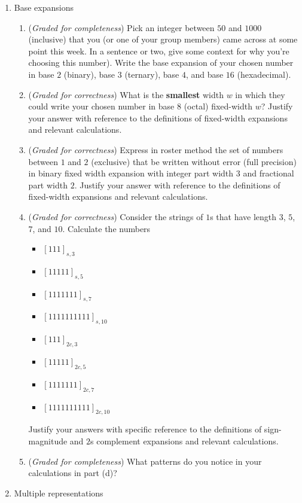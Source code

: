 \documentclass[12pt, oneside]{article}
\newcommand{\gradeCorrect}{({\it Graded for correctness}) }
\newcommand{\gradeComplete}{({\it Graded for completeness}) }
\begin{document}
\begin{enumerate}[labelindent=0pt, leftmargin=0pt]
\item Base expansions
    \begin{enumerate}
        \item\gradeComplete Pick an integer between $50$ and $1000$ (inclusive) that you (or one of your
        group members) came across at some point this week. 
        In a sentence or two, give some context for why you're choosing this number). 
        Write the base expansion of your chosen number in base $2$ (binary), base $3$ (ternary), base $4$, and base $16$ (hexadecimal).
        \item\gradeCorrect What is the {\bf smallest} width $w$ in which they could write your chosen number in base $8$ (octal) 
        fixed-width $w$? Justify your answer with reference to the definitions of fixed-width expansions and relevant calculations.
        \item\gradeCorrect Express in roster method the set of numbers between $1$ and $2$ (exclusive) that be written without error 
        (full precision)
        in binary fixed width expansion with integer part width $3$ and fractional part width $2$. Justify your answer with 
        reference to the definitions of fixed-width expansions and relevant calculations.
        \item\gradeCorrect Consider the strings of $1$s that have length $3$, $5$, $7$, and $10$.
        Calculate the numbers 
        \begin{itemize}
            \item[] $[111]_{s,3}$
            \item[] $[11111]_{s,5}$
            \item[] $[1111111]_{s,7}$
            \item[] $[1111111111]_{s,10}$
            \item[] $[111]_{2c,3}$
            \item[] $[11111]_{2c,5}$
            \item[] $[1111111]_{2c,7}$
            \item[] $[1111111111]_{2c,10}$
        \end{itemize}
        Justify your answers with specific reference to the definitions of sign-magnitude and $2$s complement expansions and relevant calculations.
        \item \gradeComplete What patterns do you notice in your calculations in part (d)?
    \end{enumerate}

\item Multiple representations


\end{enumerate}
\end{document}
